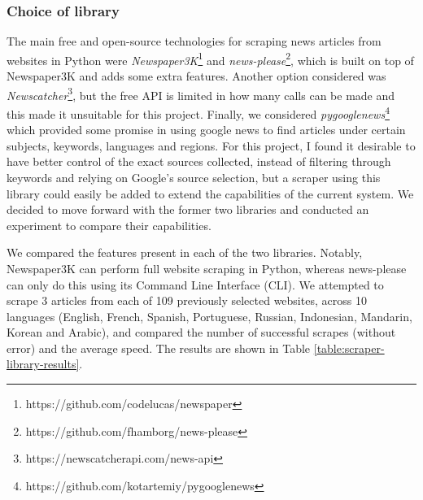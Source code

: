 \documentclass{l4proj}
\begin{document}
\subsubsection{Choice of library} \hfill \par
The main free and open-source technologies for scraping news articles from websites in Python were \emph{Newspaper3K}\footnote{https://github.com/codelucas/newspaper} and \emph{news-please}\footnote{https://github.com/fhamborg/news-please}, which is built on top of Newspaper3K and adds some extra features. Another option considered was \emph{Newscatcher}\footnote{https://newscatcherapi.com/news-api}, but the free API is limited in how many calls can be made and this made it unsuitable for this project. Finally, we considered \emph{pygooglenews}\footnote{https://github.com/kotartemiy/pygooglenews} which provided some promise in using google news to find articles under certain subjects, keywords, languages and regions. For this project, I found it desirable to have better control of the exact sources collected, instead of filtering through keywords and relying on Google's source selection, but a scraper using this library could easily be added to extend the capabilities of the current system. We decided to move forward with the former two libraries and conducted an experiment to compare their capabilities. \par

We compared the features present in each of the two libraries. Notably, Newspaper3K can perform full website scraping in Python, whereas news-please can only do this using its Command Line Interface (CLI). We attempted to scrape 3 articles from each of 109 previously selected websites, across 10 languages (English, French, Spanish, Portuguese, Russian, Indonesian, Mandarin, Korean and Arabic), and compared the number of successful scrapes (without error) and the average speed. The results are shown in Table \ref{table:scraper-library-results}. \par 
\end{document}
